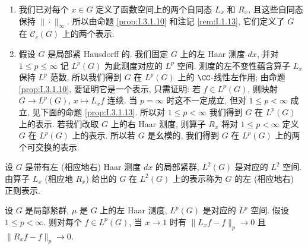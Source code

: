 \begin{example}[正则表示]
\label{exa:I.3.1.11}
\begin{enumerate}
\item[(1)] 我们已对每个 $x \in G$ 定义了函数空间上的两个自同态 $L_x$ 和 $R_x$, 且这些自同态保持 $\|\cdot\|_{\infty}$. 所以由命题 \ref{prop:I.3.1.10} 和注记 \ref{rem:I.1.13}, 它们定义了 $G$ 在 $\mathcal{C}_c(G)$ 上的两个表示.
\item[(2)] 假设 $G$ 是局部紧 Hausdorff 的. 我们固定 $G$ 上的左 Haar 测度 $dx$, 并对 $1 \leq p \leq \infty$ 记 $L^p(G)$ 为此测度对应的 $L^p$ 空间. 测度的左不变性蕴含算子 $L_x$ 保持 $L^p$ 范数, 所以我们得到 $G$ 在 $L^p(G)$ 上的 $\CC$-线性左作用; 由命题 \ref{prop:I.3.1.10}, 要证明它是一个表示, 只需证明: 若 $f \in L^p(G)$, 则映射 $G \to L^p(G)$, $x \longmapsto L_xf$ 连续. 当 $p = \infty$ 时这不一定成立, 但对 $1 \leq p < \infty$ 成立, 见下面的命题 \ref{prop:I.3.1.13}. 所以对 $1 \leq p < \infty$ 我们得到 $G$ 在 $L^p(G)$ 上的表示.
  若我们改取 $G$ 上的右 Haar 测度, 则算子 $R_x$ 将对 $1 \leq p < \infty$ 定义 $G$ 在 $L^p(G)$ 上的表示. 所以若 $G$ 是幺模的, 我们得到 $G$ 在 $L^p(G)$ 上的两个可交换的表示.
\end{enumerate}
\end{example}

\begin{definition}
\label{def:I.3.1.12}
设 $G$ 是带有左 (相应地右) Haar 测度 $dx$ 的局部紧群, $L^2(G)$ 是对应的 $L^2$ 空间. 由算子 $L_x$ (相应地 $R_x$) 给出的 $G$ 在 $L^2(G)$ 上的表示称为 $G$ 的左 (相应地右) 正则表示.
\end{definition}

\begin{proposition}[$L^p$ 中平移的连续性]
\label{prop:I.3.1.13}
设 $G$ 是局部紧群, $\mu$ 是 $G$ 上的左 Haar 测度, $L^p(G)$ 是对应的 $L^p$ 空间. 假设 $1 \leq p < \infty$.
则对每个 $f \in L^p(G)$, 当 $x \to 1$ 时有 $\|L_xf - f\|_p \to 0$ 且 $\|R_xf - f\|_p \to 0$.
\end{proposition}

